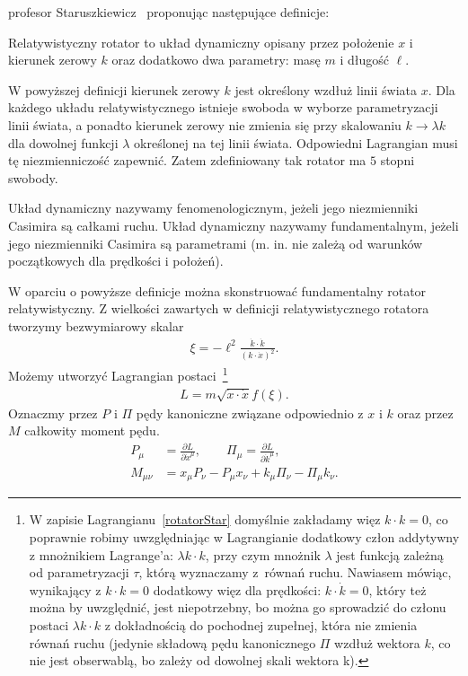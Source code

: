 profesor Staruszkiewicz~\cite{star2008} proponując następujące 
definicje:
\begin{definition}
Relatywistyczny rotator to układ dynamiczny
 opisany przez położenie $x$ i kierunek
zerowy $k$ oraz dodatkowo dwa parametry: masę $m$ i długość $\ell$.
\end{definition}
W powyższej definicji kierunek zerowy $k$ jest 
określony wzdłuż linii świata $x$. 
Dla każdego układu relatywistycznego 
istnieje swoboda w wyborze parametryzacji linii świata, a ponadto
kierunek zerowy nie zmienia się przy skalowaniu $k\to \lambda k$ 
dla dowolnej funkcji $\lambda$ określonej na tej linii świata.
Odpowiedni Lagrangian musi tę niezmienniczość zapewnić.
Zatem zdefiniowany tak rotator ma $5$ stopni swobody.
\begin{definition}
Układ dynamiczny  nazywamy fenomenologicznym, 
jeżeli jego niezmienniki Casimira są 
całkami ruchu. Układ dynamiczny nazywamy 
fundamentalnym, jeżeli jego niezmienniki
Casimira są parametrami (m. in. nie zależą od warunków początkowych
dla prędkości i położeń).
\end{definition}
W oparciu o powyższe definicje można skonstruować fundamentalny rotator
relatywistyczny. Z wielkości zawartych w definicji relatywistycznego 
rotatora tworzymy bezwymiarowy skalar
\begin{align*}
\xi = - \ell^2 \frac{\dot{k} \cdot \dot{k}}{ ( k \cdot \dot{x})^2 }.
\end{align*}
Możemy utworzyć Lagrangian postaci~\footnote{
W zapisie Lagrangianu~\eqref{rotatorStar} 
domyślnie zakładamy więz $k\cdot k=0$, 
co poprawnie robimy
uwzględniając w Lagrangianie dodatkowy człon addytywny 
z mnożnikiem Lagrange'a: $\lambda k \cdot k$, przy 
czym mnożnik $\lambda$
jest funkcją zależną od parametryzacji $\tau$, którą wyznaczamy 
z~równań ruchu. Nawiasem mówiąc, wynikający 
z $k\cdot k=0$ dodatkowy więz dla prędkości:
$k\cdot \dot{k}=0$, który też można by uwzględnić, 
jest niepotrzebny, bo można go 
sprowadzić do członu postaci $\lambda k\cdot k $
z dokładnością do pochodnej zupełnej, która
nie zmienia równań ruchu (jedynie składową pędu kanonicznego $\Pi$ 
wzdłuż wektora $k$, co nie jest obserwablą, 
bo zależy od dowolnej skali wektora k).
}
\begin{align}\label{rotatorStar}
L = m \sqrt{ \dot{x} \cdot \dot{x} } f( \xi ) .
\end{align}
Oznaczmy przez $P$ i $\Pi$ pędy kanoniczne związane 
odpowiednio z $x$ i $k$ oraz przez $M$ całkowity moment pędu.
\begin{align*}
P_\mu &= \frac{\partial L}{\partial \dot{x}^\mu}, \qquad
\Pi_\mu = \frac{\partial L}{\partial \dot{k}^\mu}, \\
M_{\mu\nu} &= x_\mu P_\nu - P_\mu x_\nu + k_\mu \Pi_\nu - \Pi_\mu k_\nu.
\end{align*}

